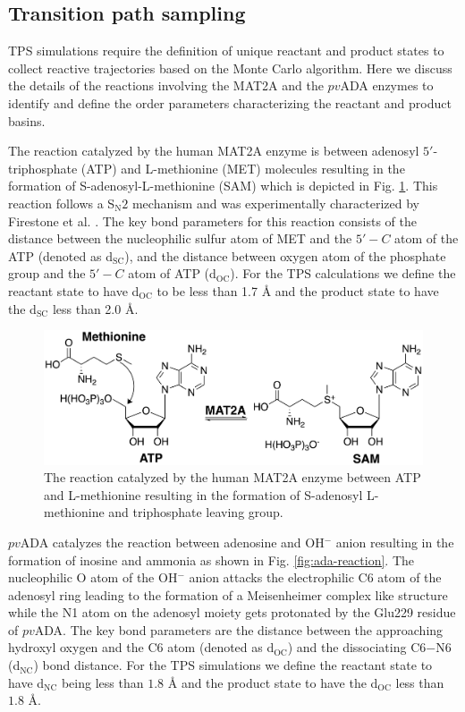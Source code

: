 \documentclass[journal=jpcbfk,manuscript=article,layout=traditional]{achemso}
\begin{document}
\subsection{Transition path sampling}
TPS simulations require the definition of unique reactant and product states
to collect reactive trajectories based on the Monte Carlo algorithm. Here we 
discuss the details of the reactions involving the MAT2A and the $pv$ADA enzymes 
to identify and define the order parameters characterizing the reactant and product basins.  

The reaction catalyzed by the human MAT2A enzyme is
between adenosyl $5'$-triphosphate (ATP) and L-methionine (MET) molecules 
resulting in the formation of S-adenosyl-L-methionine (SAM) which is 
depicted in Fig. \ref{fig:mat2a-reaction}. This reaction follows a S$_{\text{N}}2$ 
mechanism and was experimentally characterized by 
Firestone et al. \cite{Firestone17JAmChemSoc139p13754}. The key bond 
parameters for this reaction consists of the distance between the
nucleophilic sulfur atom of MET and the $5'-C$ atom of the ATP (denoted as d$_{\mathrm{SC}}$), 
and the distance between oxygen atom of the phosphate group and the $5'-C$ 
atom of ATP (d$_{\mathrm{OC}}$). For the TPS calculations we define the 
reactant state to have d$_{\mathrm{OC}}$ to be less than 1.7 {\AA} and the product 
state to have the d$_{\mathrm{SC}}$ less than 2.0 {\AA}. 

\begin{figure}
\includegraphics[width=\columnwidth]{figures/mat2a-reaction.png}
\caption{The reaction catalyzed by the human MAT2A enzyme between ATP and L-methionine resulting in the 
formation of S-adenosyl L-methionine and triphosphate leaving group.}
\label{fig:mat2a-reaction}
\end{figure}

$pv$ADA catalyzes the reaction between adenosine and OH$^{-}$ anion
resulting in the formation of inosine and ammonia as shown in
Fig. \ref{fig:ada-reaction}.
The nucleophilic O atom of the OH$^{-}$ anion
attacks the electrophilic C6 atom of the adenosyl ring leading to the 
formation of a Meisenheimer complex like structure while the N1 atom 
on the adenosyl moiety gets protonated by the Glu229 residue of $pv$ADA. 
The key bond parameters are the distance between the approaching hydroxyl 
oxygen and the C6 atom (denoted as d$_{\text{OC}}$) and the 
dissociating C6$-$N6 (d$_{\text{NC}}$) bond distance. For the TPS simulations 
we define the reactant state to have d$_{\text{NC}}$ being less than $1.8$ {\AA} 
and the product state to have the d$_{\text{OC}}$ less than $1.8$ {\AA}.
\end{document}
